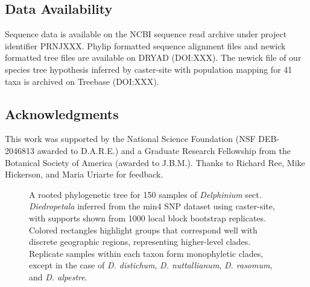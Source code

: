 \documentclass[11pt]{article}
\newcommand{\beginsupplement}{%
	\setcounter{table}{0}
	\setcounter{figure}{0}
	\renewcommand{\thetable}{S\arabic{table}}%
	\renewcommand{\thefigure}{S\arabic{figure}}%
}
\begin{document}

\subsection{Data Availability}
Sequence data is available on the NCBI sequence read archive under project identifier PRNJXXX. Phylip formatted sequence alignment files and newick formatted tree files are available on DRYAD (DOI:XXX). The newick file of our species tree hypothesis inferred by caster-site with population mapping for 41 taxa is archived on Treebase (DOI:XXX).

\subsection{Acknowledgments}
This work was supported by the National Science Foundation (NSF DEB-2046813 awarded to D.A.R.E.) and a Graduate Research Fellowship from the Botanical Society of America (awarded to J.B.M.). Thanks to Richard Ree, Mike Hickerson, and Maria Uriarte for feedback.


  


\beginsupplement

\begin{figure}[p]
	\centering
      
	\caption{
		A rooted phylogenetic tree for 150 samples of \emph{Delphinium} sect. \emph{Diedropetala}
		inferred from the min4 SNP dataset using caster-site, with supports shown from
		1000 local block bootstrap replicates. 
		Colored rectangles highlight
		groups that correspond well with discrete geographic regions, representing higher-level 
		clades. Replicate samples within each taxon form monophyletic clades, except in the case
		of \emph{D. distichum}, \emph{D. nuttallianum}, \emph{D. rasomum}, and \emph{D. alpestre}.
	}
	\label{fig:S1}
\end{figure}
\end{document}
